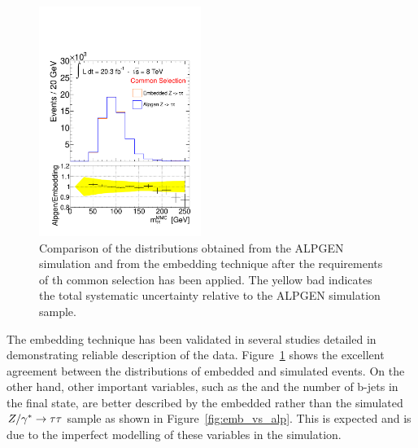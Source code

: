 \begin{figure}[t]
     \begin{center}

            \includegraphics[page=1, width=0.47\textwidth]{figure/emb_plots.pdf}
\end{center}
    \caption{Comparison of the \mmc distributions obtained from the ALPGEN \Ztautau simulation and from the embedding technique after 
	the requirements of th common selection  has been applied. 
	The yellow bad indicates the total systematic uncertainty  relative to the ALPGEN simulation sample.}
   \label{fig:emb_vs_alp1}
\end{figure}

The embedding technique has been validated in several studies detailed in~\cite{Embedding, SMnew}  demonstrating  reliable 
description of the data. Figure~\ref{fig:emb_vs_alp1} shows the excellent agreement between  the \mmc distributions of embedded and 
simulated \Ztautau events. On the other hand, other important variables, such as the \MET
and the number of b-jets in the final state, are  better described by the embedded rather than the 
simulated $Z/\gamma^*\rightarrow \tau\tau$ sample as shown in Figure~\ref{fig:emb_vs_alp}.
This  is expected and is due to the imperfect modelling of these variables in the simulation.


